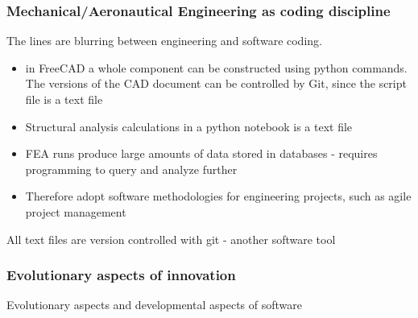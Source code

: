\documentclass{beamer}
\begin{document}
\begin{frame}
\frametitle{Mechanical/Aeronautical Engineering as coding discipline}

The lines are blurring between engineering and software coding.

\begin{itemize}
\item in FreeCAD a whole component can be constructed using python commands.  The versions of the CAD document can be controlled by Git, since the script file is a text file
\item Structural analysis calculations in a python notebook is a text file 
\item FEA runs produce large amounts of data stored in databases - requires programming to query and analyze further
\item Therefore adopt software methodologies for  engineering projects, such as agile project management
\end{itemize}

All text files are version controlled with git - another software tool

\end{frame}




\begin{frame}
\frametitle{Evolutionary aspects of innovation}

Evolutionary aspects and developmental aspects of software
\end{frame}
\end{document}

